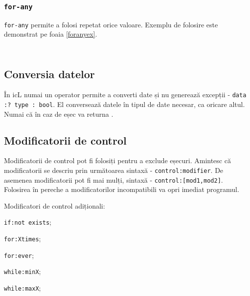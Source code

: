 \subsubsection{\texttt{for-any}}

\texttt{for-any} permite a folosi repetat orice valoare. Exemplu de folosire este demonstrat pe foaia \ref{foranyex}.

\begin{sourcecode}
    \label{ifexistsex}
    \inputminted[linenos]{icl}{../sources/ifexistsex.icL}
\end{sourcecode}

\begin{sourcecode}
    \label{foranyex}
    \inputminted[linenos]{icl}{../sources/foranyex.icL}
\end{sourcecode}


\subsection{Conversia datelor}

În icL numai un operator permite a converti date și nu generează excepții - \texttt{data :? type : bool}.
El conversează datele în tipul de date necesar, ca oricare altul. Numai că în caz de eșec va returna \void.

\subsection{Modificatorii de control}

Modificatorii de control pot fi folosiți pentru a exclude eșecuri.
Amintesc că modificatorii se descriu prin următoarea sintaxă - \texttt{control:modifier}. De asemenea modificatorii pot fi mai mulți, sintaxă - \texttt{control:[mod1,mod2]}. Folosirea în pereche a modificatorilor incompatibili va opri imediat programul.

Modificatori de control adiționali:
\begin{icItems}
	\item \texttt{if:not exists};
	\item \texttt{for:Xtimes};
	\item \texttt{for:ever};
	\item \texttt{while:minX};
	\item \texttt{while:maxX};
\end{icItems}

